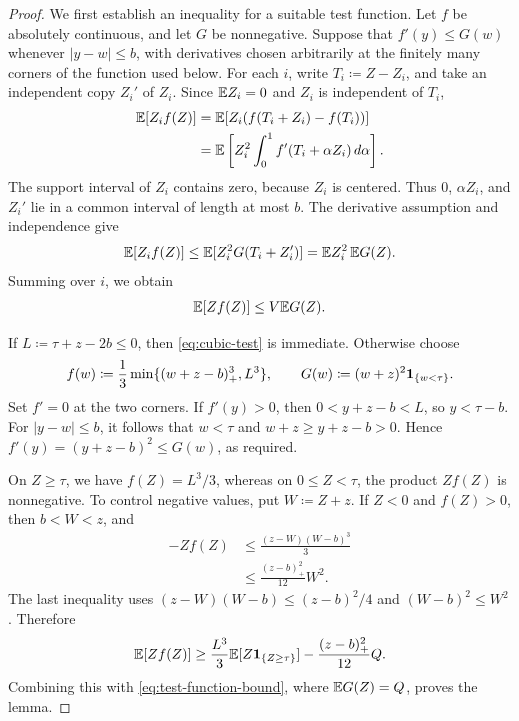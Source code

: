 \begin{proof}
We first establish an inequality for a suitable test function.
Let $f$ be absolutely continuous, and let $G$ be nonnegative.
Suppose that $f'(y)\le G(w)$ whenever $|y-w|\le b$, with derivatives chosen arbitrarily at the finitely many corners of the function used below.
For each $i$, write $T_i\coloneqq Z-Z_i$, and take an independent copy $Z_i'$ of $Z_i$.
Since $\mathbb E Z_i=0$ and $Z_i$ is independent of $T_i$,
\begin{align*}
 \mathbb E[Z_if(Z)]
 &=\mathbb E[Z_i(f(T_i+Z_i)-f(T_i))]\\
 &=\mathbb E\left[Z_i^2\int_0^1 f'(T_i+\alpha Z_i)\,d\alpha\right].
\end{align*}
The support interval of $Z_i$ contains zero, because $Z_i$ is centered.
Thus $0$, $\alpha Z_i$, and $Z_i'$ lie in a common interval of length at most $b$.
The derivative assumption and independence give
\begin{align*}
 \mathbb E[Z_if(Z)]\le\mathbb E[Z_i^2G(T_i+Z_i')]
 =\mathbb E Z_i^2\,\mathbb E G(Z).
\end{align*}
Summing over $i$, we obtain
\begin{align}
 \mathbb E[Zf(Z)]\le V\mathbb E G(Z).
 \label{eq:test-function-bound}
\end{align}

If $L\coloneqq\tau+z-2b\le0$, then \cref{eq:cubic-test} is immediate.
Otherwise choose
\begin{align*}
 f(w)\coloneqq\frac13\min\{(w+z-b)_+^3,L^3\},
 \qquad
 G(w)\coloneqq(w+z)^2\mathbf 1_{\{w<\tau\}}.
\end{align*}
Set $f'=0$ at the two corners.
If $f'(y)>0$, then $0<y+z-b<L$, so $y<\tau-b$.
For $|y-w|\le b$, it follows that $w<\tau$ and $w+z\ge y+z-b>0$.
Hence $f'(y)=(y+z-b)^2\le G(w)$, as required.

On $Z\ge\tau$, we have $f(Z)=L^3/3$, whereas on $0\le Z<\tau$, the product $Zf(Z)$ is nonnegative.
To control negative values, put $W\coloneqq Z+z$.
If $Z<0$ and $f(Z)>0$, then $b<W<z$, and
\begin{align*}
 -Zf(Z)
 &\le\frac{(z-W)(W-b)^3}{3}\\
 &\le\frac{(z-b)_+^2}{12}W^2.
\end{align*}
The last inequality uses $(z-W)(W-b)\le(z-b)^2/4$ and $(W-b)^2\le W^2$.
Therefore
\begin{align*}
 \mathbb E[Zf(Z)]
 \ge\frac{L^3}{3}\mathbb E[Z\mathbf 1_{\{Z\ge\tau\}}]
 -\frac{(z-b)_+^2}{12}Q.
\end{align*}
Combining this with \cref{eq:test-function-bound}, where $\mathbb E G(Z)=Q$, proves the lemma.
\end{proof}


